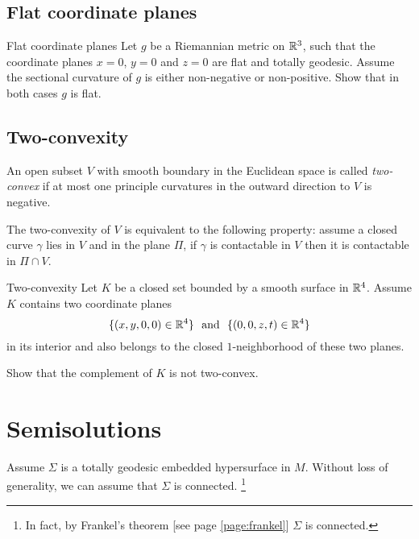 \subsection*{Flat coordinate planes}

\begin{pr}{}{Flat coordinate planes}\label{Flat coordinate planes}
Let $g$ be a Riemannian metric on $\mathbb{R}^3$,
such that the coordinate planes $x=0$, $y=0$ and $z=0$ are flat and totally geodesic.
Assume the sectional curvature of $g$ is either non-negative or non-positive.
Show that in both cases $g$ is flat. 
\end{pr}

\subsection*{Two-convexity\many}

An open subset $V$ with smooth boundary in the Euclidean space  
is called \emph{two-convex} if at most one principle curvatures in the outward direction to $V$ is negative.

The two-convexity of $V$ is equivalent to the following property:
assume a closed curve $\gamma$ lies in $V$ and in the plane $\Pi$,
if $\gamma$ is contactable in $V$ then it is contactable in $\Pi\cap V$.

\begin{pr}{\many}{Two-convexity}\label{Two-convexity}
Let $K$ be a closed set bounded by a smooth surface
in $\mathbb{R}^4$.
Assume $K$ contains two coordinate planes $$\{(x,y,0,0)\in\RR^4\}\ \ 
\text{and}
\ \ \{(0,0,z,t)\in\RR^4\}$$
in its interior 
and also belongs to the closed $1$-neighborhood of these two planes.

Show that the complement of $K$ is not two-convex.
\end{pr}

\section*{Semisolutions}



Assume $\Sigma$ is a totally geodesic embedded hypersurface in $M$.
Without loss of generality, we can assume that $\Sigma$ is connected.%
\footnote{In fact, by Frankel's theorem [see page \ref{page:frankel}] $\Sigma$ is connected.}

